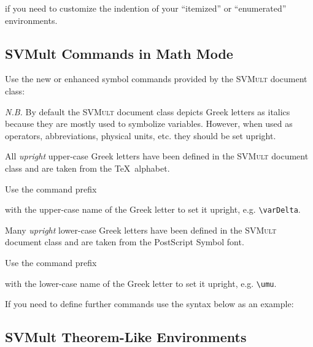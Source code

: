 \documentclass[graybox]{svmult}
\begin{document}
\begin{refguide}
\begin{sloppy}
if you need to customize the indention of your ``itemized'' or ``enumerated'' environments.

\subsection{SVMult Commands in Math Mode}\label{subsec:5}

Use the new or enhanced symbol commands provided by the \textsc{SVMult} document class:

\cprotect{}

\textit{N.B.} By default the \textsc{SVMult} document class depicts Greek letters as italics
because they are mostly used to symbolize variables. However, when used as
operators, abbreviations, physical units, etc. they should be set upright.

All \textit{upright} upper-case Greek letters have been defined in the \textsc{SVMult} document class and are taken from the \TeX\ alphabet.

Use the command prefix

\cprotect{}

with the upper-case name of the Greek letter to set it upright, e.g. \verb|\varDelta|.

Many \textit{upright} lower-case Greek letters have been defined in the \textsc{SVMult} document class and are taken from the PostScript Symbol font.

Use the command prefix

\cprotect{}

with the lower-case name of the Greek letter to set it upright, e.g. \verb|\umu|.

If you need to define further commands use the syntax below as an example:

\cprotect{}

\subsection{SVMult Theorem-Like Environments}\label{subsec:6}


\end{sloppy}
\end{refguide}
\end{document}
